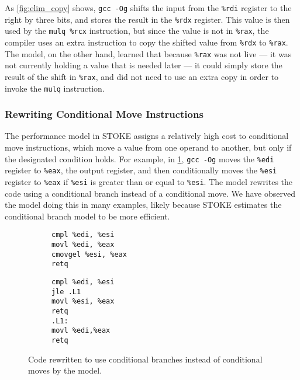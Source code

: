 \documentclass{article}
\begin{document}
As \cref{fig:elim_copy} shows,
\texttt{gcc -Og} shifts the input from the \texttt{\%rdi} register to the right by three bits, and stores the result in the \texttt{\%rdx} register.  This value is then used by the \texttt{mulq \%rcx} instruction, but since the value is not in \texttt{\%rax}, the compiler uses an extra instruction to copy the shifted value from \texttt{\%rdx} to \texttt{\%rax}.
%
The model, on the other hand, learned that because \texttt{\%rax} was not live --- it was not currently holding a value that is needed later --- it could simply store the result of the shift in \texttt{\%rax}, and did not need to use an extra copy in order to invoke the \texttt{mulq} instruction.

\subsubsection{Rewriting Conditional Move Instructions}


The performance model in STOKE assigns a relatively high cost to conditional move instructions, which move a value from one operand to another, but only if the designated condition holds.  For example, in \cref{fig:conditional_move}, \texttt{gcc -Og} moves the \texttt{\%edi} register to \texttt{\%eax}, the output register, and then conditionally moves the \texttt{\%esi} register to \texttt{\%eax} if \texttt{\%esi} is greater than or equal to \texttt{\%esi}.
%
The model rewrites the code using a conditional branch instead of a conditional move.  We have observed the model doing this in many examples, likely because STOKE estimates the conditional branch model to be more efficient.

\begin{figure}
    \centering
    \begin{subfigure}[t]{.45\columnwidth}
    \begin{lstlisting}[language={[x64]Assembler}]
cmpl %edi, %esi     
movl %edi, %eax    
cmovgel %esi, %eax 
retq 
    \end{lstlisting}
    \caption{\ogcodecaption}
    \end{subfigure}
    \hfil
    \begin{subfigure}[t]{.45\columnwidth}
    \begin{lstlisting}
cmpl %edi, %esi     
jle .L1
movl %esi, %eax
retq
.L1:
movl %edi,%eax
retq
    \end{lstlisting}
    \caption{\modelcodecaption}
    \end{subfigure}
    \caption{Code rewritten to use conditional branches instead of conditional moves by the model.}
    \label{fig:conditional_move}
\end{figure}
\end{document}
